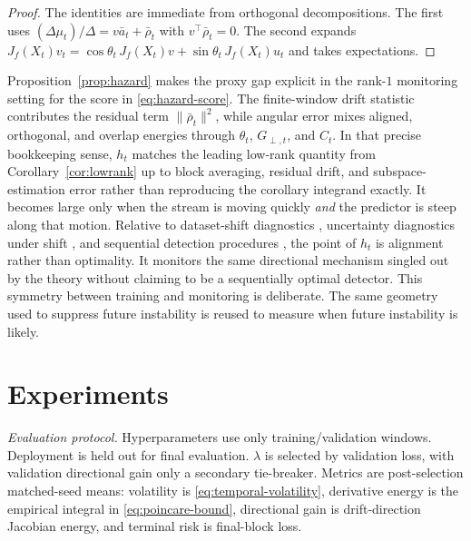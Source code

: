 \documentclass[conference]{IEEEtran}
\begin{document}
\begin{proof}
The identities are immediate from orthogonal decompositions. The first uses $(\Delta\mu_t)/\Delta=v\bar a_t+\bar\rho_t$ with $v^\top\bar\rho_t=0$. The second expands $J_f(X_t)v_t=\cos\theta_t\,J_f(X_t)v+\sin\theta_t\,J_f(X_t)u_t$ and takes expectations.
\end{proof}

Proposition~\ref{prop:hazard} makes the proxy gap explicit in the rank-$1$ monitoring setting for the score in \eqref{eq:hazard-score}. The finite-window drift statistic contributes the residual term $\|\bar\rho_t\|^2$, while angular error mixes aligned, orthogonal, and overlap energies through $\theta_t$, $G_{\perp,t}$, and $C_t$. In that precise bookkeeping sense, $h_t$ matches the leading low-rank quantity from Corollary~\ref{cor:lowrank} up to block averaging, residual drift, and subspace-estimation error rather than reproducing the corollary integrand exactly. It becomes large only when the stream is moving quickly \emph{and} the predictor is steep along that motion. Relative to dataset-shift diagnostics \cite{rabanser-shift}, uncertainty diagnostics under shift \cite{ovadia-shift}, and sequential detection procedures \cite{wu-rscusum,cao-xie-allerton2015,cooper-allerton2024}, the point of $h_t$ is alignment rather than optimality. It monitors the same directional mechanism singled out by the theory without claiming to be a sequentially optimal detector.
This symmetry between training and monitoring is deliberate. The same geometry used to suppress future instability is reused to measure when future instability is likely.

\section{Experiments}
\textit{Evaluation protocol.}
Hyperparameters use only training/validation windows. Deployment is held out for final evaluation. $\lambda$ is selected by validation loss, with validation directional gain only a secondary tie-breaker. Metrics are post-selection matched-seed means: volatility is \eqref{eq:temporal-volatility}, derivative energy is the empirical integral in \eqref{eq:poincare-bound}, directional gain is drift-direction Jacobian energy, and terminal risk is final-block loss.
\end{document}
